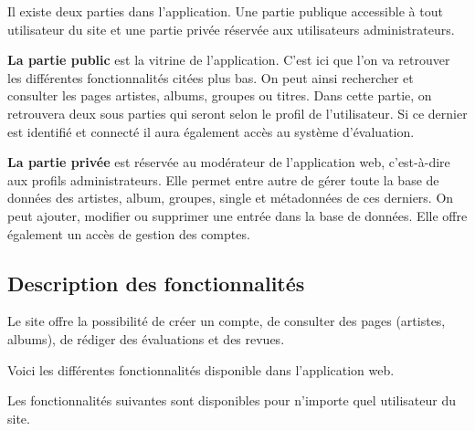     \begin{paragraphe}
      Il existe deux parties dans l'application. Une partie publique accessible à tout utilisateur du site et une partie
      privée réservée aux utilisateurs administrateurs.
    \end{paragraphe}

    \begin{paragraphe}
      \textbf{La partie public} est la vitrine de l'application. C'est ici que l'on
      va retrouver les différentes fonctionnalités citées plus bas. On peut
      ainsi rechercher et consulter les pages artistes, albums, groupes ou titres.
      Dans cette partie, on retrouvera deux sous parties qui seront selon le profil de l'utilisateur.
      Si ce dernier est identifié et connecté il aura également accès au système d'évaluation.

      \textbf{La partie privée} est réservée au modérateur de l'application web, c'est-à-dire aux profils administrateurs.
      Elle permet entre autre de gérer toute la base de données des artistes,
      album, groupes, single et métadonnées de ces derniers. On peut ajouter, modifier
      ou supprimer une entrée dans la base de données.
      Elle offre également un accès de gestion des comptes.
    \end{paragraphe}

  \subsection{Description des fonctionnalités}

    \begin{paragraphe}
      	Le site offre la possibilité de créer un compte, de consulter des pages
        (artistes, albums), de rédiger des évaluations et des revues.
    \end{paragraphe}

    \begin{paragraphe}
      Voici les différentes fonctionnalités disponible dans l'application web.
    \end{paragraphe}

    \begin{paragraphe}
      Les fonctionnalités suivantes sont disponibles pour n'importe quel utilisateur du site.
    \end{paragraphe}


